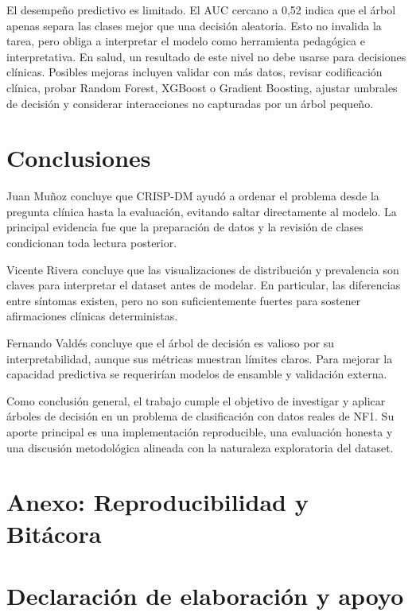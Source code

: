 \documentclass[10pt,a4paper]{article}
\begin{document}
El desempeño predictivo es limitado. El AUC cercano a 0,52 indica que el árbol apenas separa las clases mejor que una decisión aleatoria. Esto no invalida la tarea, pero obliga a interpretar el modelo como herramienta pedagógica e interpretativa. En salud, un resultado de este nivel no debe usarse para decisiones clínicas. Posibles mejoras incluyen validar con más datos, revisar codificación clínica, probar Random Forest, XGBoost o Gradient Boosting, ajustar umbrales de decisión y considerar interacciones no capturadas por un árbol pequeño.

\section{Conclusiones}

Juan Muñoz concluye que CRISP-DM ayudó a ordenar el problema desde la pregunta clínica hasta la evaluación, evitando saltar directamente al modelo. La principal evidencia fue que la preparación de datos y la revisión de clases condicionan toda lectura posterior.

Vicente Rivera concluye que las visualizaciones de distribución y prevalencia son claves para interpretar el dataset antes de modelar. En particular, las diferencias entre síntomas existen, pero no son suficientemente fuertes para sostener afirmaciones clínicas deterministas.

Fernando Valdés concluye que el árbol de decisión es valioso por su interpretabilidad, aunque sus métricas muestran límites claros. Para mejorar la capacidad predictiva se requerirían modelos de ensamble y validación externa.

Como conclusión general, el trabajo cumple el objetivo de investigar y aplicar árboles de decisión en un problema de clasificación con datos reales de NF1. Su aporte principal es una implementación reproducible, una evaluación honesta y una discusión metodológica alineada con la naturaleza exploratoria del dataset.




\clearpage
\appendix
\section{Anexo: Reproducibilidad y Bitácora}

\section*{Declaración de elaboración y apoyo}
\end{document}
